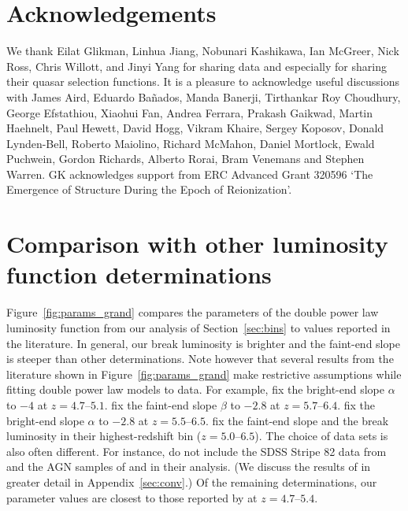 \documentclass[fleqn,usenatbib]{mnras}
\begin{document}
      \section*{Acknowledgements}

      We thank Eilat Glikman, Linhua Jiang, Nobunari Kashi\-kawa, Ian
      McGreer, Nick Ross, Chris Willott, and Jinyi Yang for sharing data and
      especially for sharing their quasar selection functions.  It is a
      pleasure to acknowledge useful discussions with James Aird, Eduardo
      Ba\~nados, Manda Banerji, Tirthankar Roy Choudhury, George Efstathiou,
      Xiaohui Fan, Andrea Ferrara, Prakash Gaikwad, Martin Haehnelt, Paul
      Hewett, David Hogg, Vikram Khaire, Sergey Koposov, Donald Lynden-Bell,
      Roberto Maiolino, Richard McMahon, Daniel Mortlock, Ewald Puchwein,
      Gordon Richards, Alberto Rorai, Bram Venemans and Stephen Warren.  GK
      acknowledges support from ERC Advanced Grant 320596 `The Emergence of
      Structure During the Epoch of Reionization'.

      \appendix

      \section{Comparison with other luminosity function determinations}

      Figure~\ref{fig:params_grand} compares the parameters of the double
      power law luminosity function from our analysis of
      Section~\ref{sec:bins} to values reported in the literature.  In
      general, our break luminosity is brighter and the faint-end slope is
      steeper than other determinations.  Note however that several results
      from the literature shown in Figure~\ref{fig:params_grand} make
      restrictive assumptions while fitting double power law models to data.
      For example, \citet{2013ApJ...768..105M} fix the bright-end slope
      $\alpha$ to $-4$ at $z=4.7$--$5.1$.  \citet{2016ApJ...833..222J} fix
      the faint-end slope $\beta$ to $-2.8$ at $z=5.7$--$6.4$.
      \citet{2017ApJ...847L..15O} fix the bright-end slope $\alpha$ to
      $-2.8$ at $z=5.5$--$6.5$.  \citet{2015AA...578A..83G} fix the
      faint-end slope and the break luminosity in their highest-redshift bin
      ($z=5.0$--$6.5$).  The choice of data sets is also often different.
      For instance, \citet{2015AA...578A..83G} do not include the SDSS
      Stripe 82 data from \citet{2013ApJ...768..105M} and the AGN samples of
      \citet{2010AJ....139..906W} and \citet{2015ApJ...798...28K} in their
      analysis.  (We discuss the results of \citet{2015AA...578A..83G} in
      greater detail in Appendix~\ref{sec:conv}.)  Of the remaining
      determinations, our parameter values are closest to those reported by
      \citet{2016ApJ...829...33Y} at $z=4.7$--$5.4$.
\end{document}
